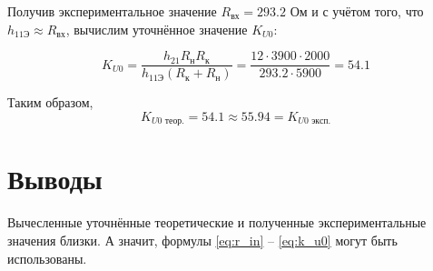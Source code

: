 \documentclass[a4paper,14pt]{extarticle}
\begin{document}
Получив экспериментальное значение $R_\text{вх} = 293.2$ Ом и с учётом того, что $h_{11\text{Э}} \approx R_\text{вх}$, вычислим уточнённое значение $K_{U0}$: 

\[
K_{U0} = \frac{h_{21}R_\text{н}R_\text{к}}{h_\text{11Э}(R_\text{к}+R_\text{н})} = \frac{12 \cdot 3900 \cdot 2000}{293.2 \cdot 5900} = 54.1
\]

Таким образом, 
\[
K_{U0\text{ теор.}} = 54.1 \approx 55.94 = K_{U0\text{ эксп.}}
\]

\section{Выводы}

Вычесленные уточнённые теоретические и полученные экспериментальные значения близки. А значит, формулы \ref{eq:r_in} -- \ref{eq:k_u0} могут быть использованы.
\end{document}
